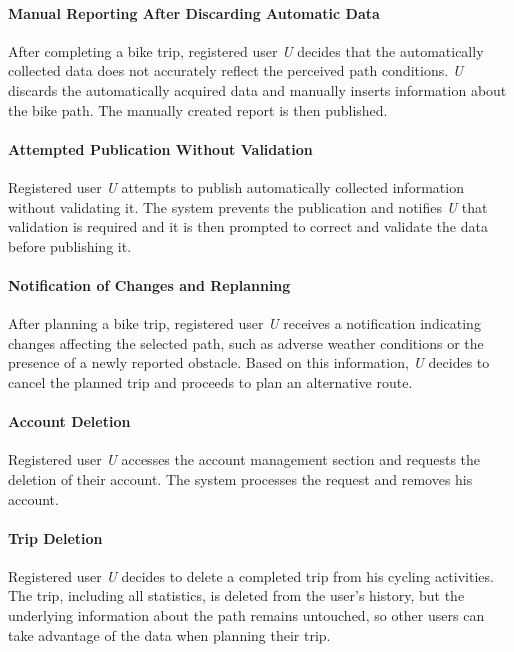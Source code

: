 \paragraph{Manual Reporting After Discarding Automatic Data}
After completing a bike trip, registered user \textit{U} decides that the automatically collected data does not accurately reflect the perceived path conditions. \textit{U} discards the automatically acquired data and manually inserts information about the bike path. The manually created report is then published.

\paragraph{Attempted Publication Without Validation}
Registered user \textit{U} attempts to publish automatically collected information without validating it. The system prevents the publication and notifies \textit{U} that validation is required and it is then prompted to correct and validate the data before publishing it.

\paragraph{Notification of Changes and Replanning}
After planning a bike trip, registered user \textit{U} receives a notification indicating changes affecting the selected path, such as adverse weather conditions or the presence of a newly reported obstacle. Based on this information, \textit{U} decides to cancel the planned trip and proceeds to plan an alternative route.

\paragraph{Account Deletion}
Registered user \textit{U} accesses the account management section and requests the deletion of their account. The system processes the request and removes his account.

\paragraph{Trip Deletion}
Registered user \textit{U} decides to delete a completed trip from his cycling activities. The trip, including all statistics, is deleted from the user's history, but the underlying information about the path remains untouched, so other users can take advantage of the data when planning their trip.

